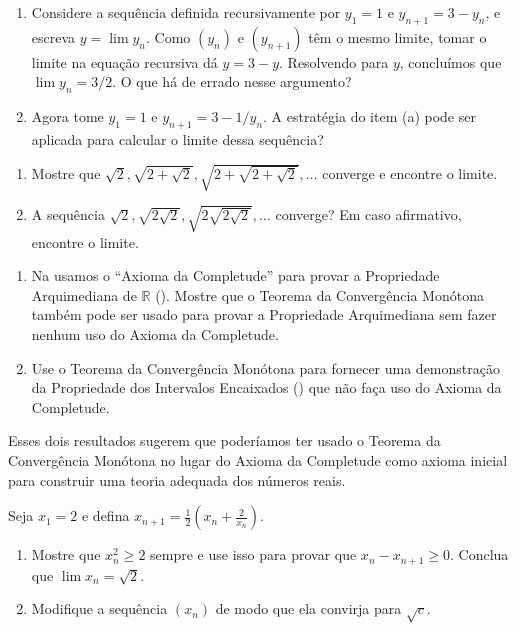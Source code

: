 \begin{exercise}\label{ex:2-4-2}
\begin{enumerate}[label=\alph*)]
\item Considere a sequência definida recursivamente por $y_1=1$ e $y_{n+1}=3-y_n$, e escreva $y=\lim y_n$. Como $(y_n)$ e $(y_{n+1})$ têm o mesmo limite, tomar o limite na equação recursiva dá $y=3-y$. Resolvendo para $y$, concluímos que $\lim y_n=3/2$. O que há de errado nesse argumento?
\item Agora tome $y_1=1$ e $y_{n+1}=3-1/y_n$. A estratégia do item (a) pode ser aplicada para calcular o limite dessa sequência?
\end{enumerate}
\end{exercise}

\begin{exercise}\label{ex:2-4-3}
\begin{enumerate}[label=\alph*)]
\item Mostre que $\sqrt2,\sqrt{2+\sqrt2},\sqrt{2+\sqrt{2+\sqrt2}},\ldots$ converge e encontre o limite.
\item A sequência $\sqrt2,\sqrt{2\sqrt2},\sqrt{2\sqrt{2\sqrt2}},\ldots$ converge? Em caso afirmativo, encontre o limite.
\end{enumerate}
\end{exercise}

\begin{exercise}\label{ex:2-4-4}
\begin{enumerate}[label=\alph*)]
\item Na  usamos o ``Axioma da Completude'' para provar a Propriedade Arquimediana de $\mathbb{R}$ (). Mostre que o Teorema da Convergência Monótona também pode ser usado para provar a Propriedade Arquimediana sem fazer nenhum uso do Axioma da Completude.
\item Use o Teorema da Convergência Monótona para fornecer uma demonstração da Propriedade dos Intervalos Encaixados () que não faça uso do Axioma da Completude.
\end{enumerate}
Esses dois resultados sugerem que poderíamos ter usado o Teorema da Convergência Monótona no lugar do Axioma da Completude como axioma inicial para construir uma teoria adequada dos números reais.
\end{exercise}

\begin{exercise}\label{ex:2-4-5}
Seja $x_1=2$ e defina $x_{n+1}=\frac12\left(x_n+\frac2{x_n}\right)$.
\begin{enumerate}[label=\alph*)]
\item Mostre que $x_n^2\geq2$ sempre e use isso para provar que $x_n-x_{n+1}\geq0$. Conclua que $\lim x_n=\sqrt2$.
\item Modifique a sequência $(x_n)$ de modo que ela convirja para $\sqrt c$.
\end{enumerate}
\end{exercise}

